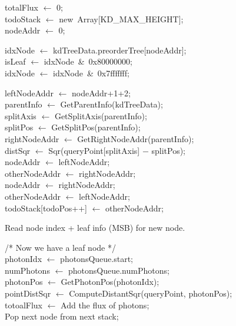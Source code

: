 \begin{algorithm}
	\SetAlgoLined
	
	totalFlux \(\leftarrow\) 0; \\
	todoStack \(\leftarrow\) new\ Array[KD\_MAX\_HEIGHT]; \\
	nodeAddr \(\leftarrow\) 0; \\

	 {

		idxNode \(\leftarrow\) kdTreeData.preorderTree[nodeAddr]; \\ 
		isLeaf \(\leftarrow\) idxNode\ \&\ 0x80000000; \\ 
		idxNode \(\leftarrow\) idxNode\ \&\ 0x7fffffff; \\ 
		
		 {
			leftNodeAddr \(\leftarrow\) nodeAddr+1+2; \\
		
			parentInfo \(\leftarrow\) GetParentInfo(kdTreeData); \\
			splitAxis \(\leftarrow\) GetSplitAxis(parentInfo); \\ 
			splitPos \(\leftarrow\) GetSplitPos(parentInfo); \\
			rightNodeAddr \(\leftarrow\) GetRightNodeAddr(parentInfo); \\
		
			distSqr \(\leftarrow\) Sqr(queryPoint[splitAxis] \(-\) splitPos); \\ 
			
			nodeAddr \(\leftarrow\) leftNodeAddr; \\
			otherNodeAddr \(\leftarrow\) rightNodeAddr; \\
			 {
				nodeAddr \(\leftarrow\) rightNodeAddr; \\
				otherNodeAddr \(\leftarrow\) leftNodeAddr; \\
			}
			 { 
				todoStack[todoPos++] \(\leftarrow\) otherNodeAddr; \\ 
			} 
			
			Read node index + leaf info (MSB) for new node. \\
		}
		
		/* Now we have a leaf node */ \\
		photonIdx \(\leftarrow\) photonsQueue.start; \\
		numPhotons \(\leftarrow\) photonsQueue.numPhotons; \\
		 {
			photonPos \(\leftarrow\) GetPhotonPos(photonIdx); \\
			pointDistSqr \(\leftarrow\) ComputeDistantSqr(queryPoint, photonPos); \\
			 {
				totoalFlux \(\leftarrow\) Add the flux of photons; \\
			} 
		} 
		Pop next node from next stack; \\	
	}	
	

\end{algorithm}
